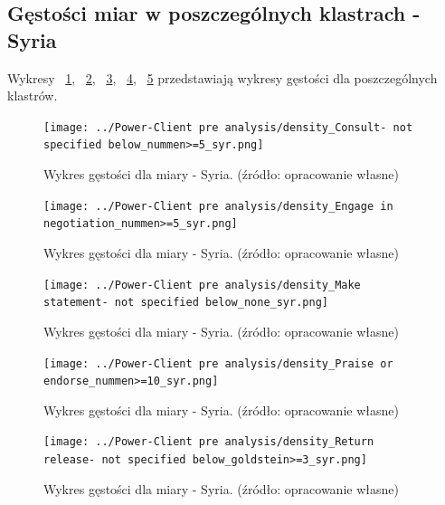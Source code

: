 \documentclass[11pt]{report}
\begin{document}
    \subsection{Gęstości miar w poszczególnych klastrach - Syria}\label{subsec:gęstośc-miar-w-poszczególnych-klastrach---syria}

    Wykresy
    ~\ref{fig:density_Consult- not specified below_nummen>=5_syr},
    ~\ref{fig:density_Engage in negotiation_nummen>=5_syr},
    ~\ref{fig:density_Make statement- not specified below_none_syr},
    ~\ref{fig:density_Praise or endorse_nummen>=10_syr},
    ~\ref{fig:density_Return release- not specified below_goldstein>=3_syr}
    przedstawiają wykresy gęstości dla poszczególnych klastrów.

    \begin{figure}[!htp]
        \centering
        \texttt{[image: ../Power-Client pre analysis/density\_Consult- not specified below\_nummen>=5\_syr.png]}
        \caption{Wykres gęstości dla miary - Syria. (źródło: opracowanie własne)}
        \label{fig:density_Consult- not specified below_nummen>=5_syr}
    \end{figure}
    \begin{figure}[!htp]
        \centering
        \texttt{[image: ../Power-Client pre analysis/density\_Engage in negotiation\_nummen>=5\_syr.png]}
        \caption{Wykres gęstości dla miary - Syria. (źródło: opracowanie własne)}
        \label{fig:density_Engage in negotiation_nummen>=5_syr}
    \end{figure}
    \begin{figure}[!htp]
        \centering
        \texttt{[image: ../Power-Client pre analysis/density\_Make statement- not specified below\_none\_syr.png]}
        \caption{Wykres gęstości dla miary - Syria. (źródło: opracowanie własne)}
        \label{fig:density_Make statement- not specified below_none_syr}
    \end{figure}
    \begin{figure}[!htp]
        \centering
        \texttt{[image: ../Power-Client pre analysis/density\_Praise or endorse\_nummen>=10\_syr.png]}
        \caption{Wykres gęstości dla miary - Syria. (źródło: opracowanie własne)}
        \label{fig:density_Praise or endorse_nummen>=10_syr}
    \end{figure}
    \begin{figure}[!htp]
        \centering
        \texttt{[image: ../Power-Client pre analysis/density\_Return release- not specified below\_goldstein>=3\_syr.png]}
        \caption{Wykres gęstości dla miary - Syria. (źródło: opracowanie własne)}
        \label{fig:density_Return release- not specified below_goldstein>=3_syr}
    \end{figure}
\end{document}
